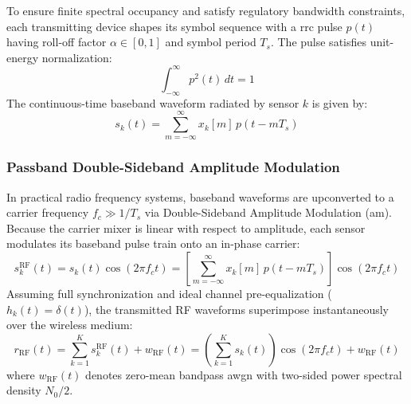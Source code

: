 \documentclass[Markos_Delaportas_1316.tex]{subfiles}
\begin{document}
To ensure finite spectral occupancy and satisfy regulatory bandwidth
constraints, each transmitting device shapes its
symbol sequence with a \gls{rrc} pulse $p(t)$ having roll-off factor
$\alpha \in [0, 1]$ and symbol period $T_s$. The pulse
satisfies unit-energy normalization:
\begin{equation}
    \int_{-\infty}^{\infty} p^2(t) \, dt = 1
    \label{eq:rrc_continuous_unit_energy}
\end{equation}
The continuous-time baseband waveform radiated by sensor $k$ is given by:
\begin{equation}
    s_k(t) = \sum_{m=-\infty}^{\infty} x_k[m] \, p(t - m T_s)
    \label{eq:single_node_baseband_signal}
\end{equation}

\subsubsection{Passband Double-Sideband Amplitude Modulation}
\label{subsubsec:passband_am_formulation}
In practical radio frequency systems, baseband waveforms are
upconverted to a carrier frequency $f_c \gg 1/T_s$ via
Double-Sideband Amplitude Modulation (\gls{am}). Because the carrier
mixer is linear with respect to amplitude, each
sensor modulates its baseband pulse train onto an in-phase carrier:
\begin{equation}
    s_k^{\text{RF}}(t) = s_k(t) \cos(2\pi f_c t) = \left[
    \sum_{m=-\infty}^{\infty} x_k[m] \, p(t - m T_s) \right] \cos(2\pi f_c t)
    \label{eq:passband_transmitted_signal}
\end{equation}
Assuming full synchronization and ideal channel pre-equalization
($h_k(t) = \delta(t)$), the transmitted RF waveforms
superimpose instantaneously over the wireless medium:
\begin{equation}
    r_{\text{RF}}(t) = \sum_{k=1}^K s_k^{\text{RF}}(t) +
    w_{\text{RF}}(t) = \left( \sum_{k=1}^K s_k(t) \right) \cos(2\pi
    f_c t) + w_{\text{RF}}(t)
    \label{eq:passband_superposition}
\end{equation}
where $w_{\text{RF}}(t)$ denotes zero-mean bandpass \gls{awgn} with
two-sided power spectral density $N_0 / 2$.
\end{document}
